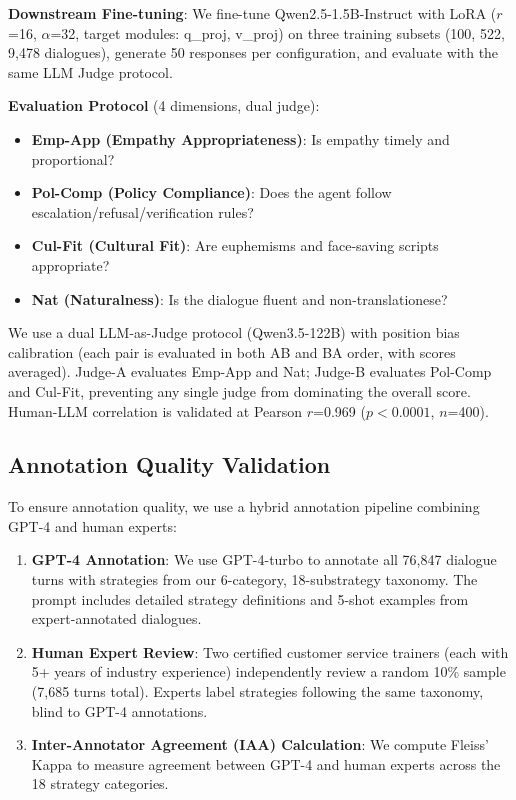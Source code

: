 \documentclass[11pt]{article}
\begin{document}
\textbf{Downstream Fine-tuning}: We fine-tune Qwen2.5-1.5B-Instruct \cite{qwen2_2024} with LoRA ($r$=16, $\alpha$=32, target modules: q\_proj, v\_proj) on three training subsets (100, 522, 9,478 dialogues), generate 50 responses per configuration, and evaluate with the same LLM Judge protocol.

\textbf{Evaluation Protocol} (4 dimensions, dual judge):
\begin{itemize}
  \item \textbf{Emp-App (Empathy Appropriateness)}: Is empathy timely and proportional?
  \item \textbf{Pol-Comp (Policy Compliance)}: Does the agent follow escalation/refusal/verification rules?
  \item \textbf{Cul-Fit (Cultural Fit)}: Are euphemisms and face-saving scripts appropriate?
  \item \textbf{Nat (Naturalness)}: Is the dialogue fluent and non-translationese?
\end{itemize}

We use a dual LLM-as-Judge protocol (Qwen3.5-122B) with position bias calibration (each pair is evaluated in both AB and BA order, with scores averaged). Judge-A evaluates Emp-App and Nat; Judge-B evaluates Pol-Comp and Cul-Fit, preventing any single judge from dominating the overall score. Human-LLM correlation is validated at Pearson $r$=0.969 ($p<0.0001$, $n$=400).

\subsection{Annotation Quality Validation}

To ensure annotation quality, we use a hybrid annotation pipeline combining GPT-4 and human experts:

\begin{enumerate}
  \item \textbf{GPT-4 Annotation}: We use GPT-4-turbo to annotate all 76,847 dialogue turns with strategies from our 6-category, 18-substrategy taxonomy. The prompt includes detailed strategy definitions and 5-shot examples from expert-annotated dialogues.

  \item \textbf{Human Expert Review}: Two certified customer service trainers (each with 5+ years of industry experience) independently review a random 10\% sample (7,685 turns total). Experts label strategies following the same taxonomy, blind to GPT-4 annotations.

  \item \textbf{Inter-Annotator Agreement (IAA) Calculation}: We compute Fleiss' Kappa to measure agreement between GPT-4 and human experts across the 18 strategy categories.
\end{enumerate}
\end{document}

